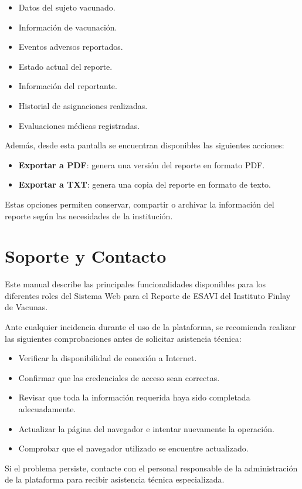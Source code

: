 \documentclass[12pt,a4paper]{report}
\begin{document}
\begin{itemize}
\item Datos del sujeto vacunado.
\item Información de vacunación.
\item Eventos adversos reportados.
\item Estado actual del reporte.
\item Información del reportante.
\item Historial de asignaciones realizadas.
\item Evaluaciones médicas registradas.
\end{itemize}

Además, desde esta pantalla se encuentran disponibles las siguientes acciones:

\begin{itemize}
\item \textbf{Exportar a PDF}: genera una versión del reporte en formato PDF.
\item \textbf{Exportar a TXT}: genera una copia del reporte en formato de texto.
\end{itemize}

Estas opciones permiten conservar, compartir o archivar la información del reporte según las necesidades de la institución.




\chapter{Soporte y Contacto}

Este manual describe las principales funcionalidades disponibles para los diferentes roles del Sistema Web para el Reporte de ESAVI del Instituto Finlay de Vacunas.

Ante cualquier incidencia durante el uso de la plataforma, se recomienda realizar las siguientes comprobaciones antes de solicitar asistencia técnica:

\begin{itemize}
\item Verificar la disponibilidad de conexión a Internet.
\item Confirmar que las credenciales de acceso sean correctas.
\item Revisar que toda la información requerida haya sido completada adecuadamente.
\item Actualizar la página del navegador e intentar nuevamente la operación.
\item Comprobar que el navegador utilizado se encuentre actualizado.
\end{itemize}

Si el problema persiste, contacte con el personal responsable de la administración de la plataforma para recibir asistencia técnica especializada.
\end{document}
